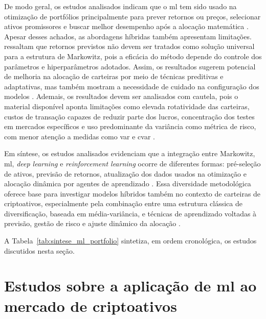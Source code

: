 De modo geral, os estudos analisados indicam que o \acl{ml} tem sido usado na otimização de portfólios principalmente para prever retornos ou preços, selecionar ativos promissores e buscar melhor desempenho após a alocação matemática \cite{paiva2019decision,wang2020portfolio,chen2021mean,ma2021portfolio,padhi2022intelligent}. Apesar desses achados, as abordagens híbridas também apresentam limitações.  ressaltam que retornos previstos não devem ser tratados como solução universal para a estrutura de Markowitz, pois a eficácia do método depende do controle dos parâmetros e hiperparâmetros adotados. Assim, os resultados sugerem potencial de melhoria na alocação de carteiras por meio de técnicas preditivas e adaptativas, mas também mostram a necessidade de cuidado na configuração dos modelos \cite{slusarczyk2025optimal}. Ademais, os resultados devem ser analisados com cautela, pois o material disponível aponta limitações como elevada rotatividade das carteiras, custos de transação capazes de reduzir parte dos lucros, concentração dos testes em mercados específicos e uso predominante da variância como métrica de risco, com menor atenção a medidas como \acs{var} e \acs{cvar} \cite{wang2020portfolio,chen2021mean,ma2021portfolio,padhi2022intelligent}. 

Em síntese, os estudos analisados evidenciam que a integração entre Markowitz, \acl{ml}, \textit{deep learning} e \textit{reinforcement learning} ocorre de diferentes formas: pré-seleção de ativos, previsão de retornos, atualização dos dados usados na otimização e alocação dinâmica por agentes de aprendizado \cite{chaweewanchon2022markowitz,du2022mean,jang2023deep,jiang2024deep,slusarczyk2025optimal,lopez2025enhancing}. Essa diversidade metodológica oferece base para investigar modelos híbridos também no contexto de carteiras de criptoativos, especialmente pela combinação entre uma estrutura clássica de diversificação, baseada em média-variância, e técnicas de aprendizado voltadas à previsão, gestão de risco e ajuste dinâmico da alocação \cite{jiang2024deep,lopez2025enhancing,slusarczyk2025optimal}.

A Tabela~\ref{tab:sintese_ml_portfolio} sintetiza, em ordem cronológica, os estudos discutidos nesta seção.



\section{Estudos sobre a aplicação de \acl{ml} ao mercado de criptoativos}
\label{sec_estudos_machine_learning_aplicado_ao_mercado_de_criptoativos}

